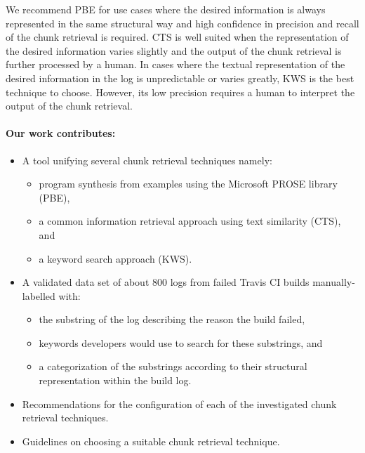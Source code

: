 \documentclass[\myrootdir/main.tex]{subfiles}
\begin{document}
We recommend PBE for use cases where the desired information is always represented in the same structural way and high confidence in precision and recall of the chunk retrieval is required.
CTS is well suited when the representation of the desired information varies slightly and the output of the chunk retrieval is further processed by a human.
In cases where the textual representation of the desired information in the log is unpredictable or varies greatly, KWS is the best technique to choose.
However, its low precision requires a human to interpret the output of the chunk retrieval.

\paragraph{Our work contributes:}
\begin{itemize}
  \item A tool unifying several chunk retrieval techniques namely:
        \begin{itemize}
          \item program synthesis from examples using the Microsoft PROSE library (PBE),
          \item a common information retrieval approach using text similarity (CTS), and
          \item a keyword search approach (KWS).
        \end{itemize}
  \item A validated data set of about 800 logs from failed Travis CI builds manually-labelled with:
        \begin{itemize}
          \item the substring of the log describing the reason the build failed,
          \item keywords developers would use to search for these substrings, and
          \item a categorization of the substrings according to their structural representation within the build log.
        \end{itemize}
  \item Recommendations for the configuration of each of the investigated chunk retrieval techniques.
  \item Guidelines on choosing a suitable chunk retrieval technique.
\end{itemize}
\end{document}
